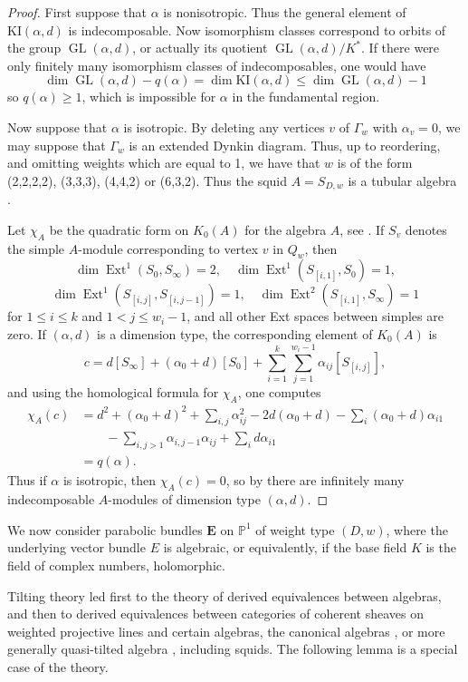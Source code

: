 \documentclass{amsart}
\theoremstyle{plain}
\theoremstyle{definition}
\theoremstyle{remark}
\newcommand{\PP}{\mathbb{P}}
\DeclareMathOperator{\GL}{GL}
\DeclareMathOperator{\Ext}{Ext}
\newcommand{\E}{\mathbf{E}}
\begin{document}
\begin{proof}
First suppose that $\alpha$ is nonisotropic. Thus the general element of
$\mathrm{KI}(\alpha,d)$ is indecomposable. Now isomorphism classes correspond to orbits of
the group $\GL(\alpha,d)$, or actually its quotient $\GL(\alpha,d)/K^*$.
If there were only finitely many isomorphism classes of indecomposables, one would have
\[
\dim \GL(\alpha,d) - q(\alpha) = \dim \mathrm{KI}(\alpha,d) \le \dim \GL(\alpha,d) - 1
\]
so $q(\alpha)\ge 1$, which is impossible for $\alpha$ in the fundamental region.

Now suppose that $\alpha$ is isotropic. By deleting any vertices $v$ of $\Gamma_w$ with
$\alpha_v=0$, we may suppose that $\Gamma_w$ is an extended Dynkin diagram.
Thus, up to reordering, and omitting weights which are equal to 1, we have
that $w$ is of the form (2,2,2,2), (3,3,3), (4,4,2) or (6,3,2).
Thus the squid $A = S_{D,w}$ is a tubular algebra \cite[\S 5]{Ringel}.

Let $\chi_A$ be the quadratic form on $K_0(A)$ for the algebra $A$,
see \cite[\S 2.4]{Ringel}. If $S_v$ denotes the simple $A$-module
corresponding to vertex $v$ in $Q_w$, then
\[
\dim \Ext^1(S_0,S_\infty)=2,
\quad
\dim \Ext^1(S_{[i,1]},S_0)=1,
\]
\[
\dim \Ext^1(S_{[i,j]},S_{[i,j-1]})=1,
\quad
\dim \Ext^2(S_{[i,1]},S_\infty)=1
\]
for $1\le i\le k$ and $1<j\le w_i-1$, and all other Ext spaces between
simples are zero. If $(\alpha,d)$ is a dimension type,
the corresponding element of $K_0(A)$ is
\[
c = d[S_\infty] + (\alpha_0+d)[S_0] + \sum_{i=1}^k\sum_{j=1}^{w_i-1} \alpha_{ij} [S_{[i,j]}],
\]
and using the homological formula for $\chi_A$, one computes
\[
\begin{split}
\chi_A(c)
& = d^2 + (\alpha_0+d)^2 + \sum_{i,j} \alpha_{ij}^2 - 2d(\alpha_0+d) - \sum_i(\alpha_0+d)\alpha_{i1} \\
& \qquad - \sum_{i,j>1} \alpha_{i,j-1}\alpha_{ij} + \sum_i d\alpha_{i1} \\
& = q(\alpha).
\end{split}
\]
Thus if $\alpha$ is isotropic, then $\chi_A(c)=0$, so by \cite[Theorem 5.2.6]{Ringel}
there are infinitely many indecomposable $A$-modules of dimension type $(\alpha,d)$.
\end{proof}


We now consider parabolic bundles $\E$ on $\PP^1$ of weight type $(D,w)$,
where the underlying vector bundle $E$ is algebraic, or equivalently,
if the base field $K$ is the field of complex numbers, holomorphic.

Tilting theory \cite{BB} led first to the theory of derived
equivalences between algebras, and then to derived equivalences between
categories of coherent sheaves on weighted projective lines
and certain algebras, the canonical algebras \cite{Lenzing},
or more generally quasi-tilted algebra \cite{HRS}, including squids.
The following lemma is a special case of the theory.
\end{document}

